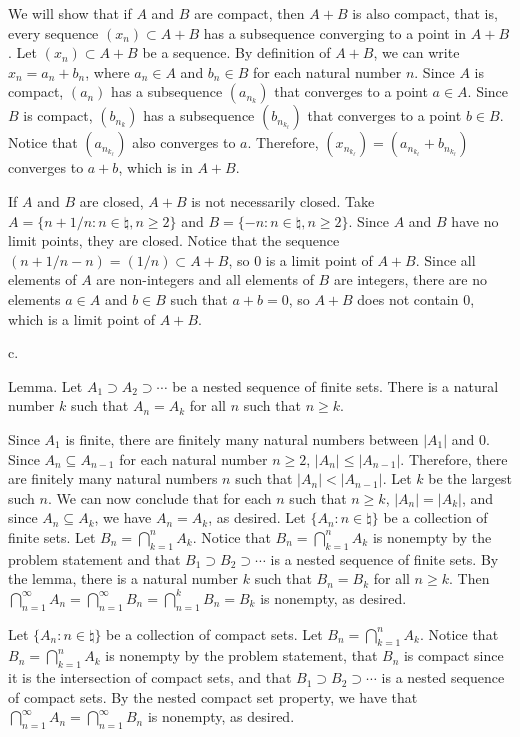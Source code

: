 We will show that if $A$ and $B$ are compact,
then $A + B$ is also compact, that is,
every sequence $(x_n) \subset A + B$ has a subsequence
converging to a point in $A + B$.
Let $(x_n) \subset A + B$ be a sequence.
By definition of $A + B$, we can write $x_n = a_n + b_n$,
where $a_n \in A$ and $b_n \in B$ for each natural number $n$.
Since $A$ is compact, $(a_n)$ has a subsequence $(a_{n_k})$
that converges to a point $a \in A$.
Since $B$ is compact, $(b_{n_k})$ has a subsequence $(b_{n_{k_\ell}})$
that converges to a point $b \in B$.
Notice that $(a_{n_{k_\ell}})$ also converges to $a$.
Therefore, $(x_{n_{k_\ell}}) = (a_{n_{k_\ell}} + b_{n_{k_\ell}})$
converges to $a + b$, which is in $A + B$.

If $A$ and $B$ are closed, $A + B$ is not necessarily closed.
Take $A = \{n + 1/n : n \in \natural, n \ge 2\}$ and
$B = \{-n : n \in \natural, n \ge 2\}$.
Since $A$ and $B$ have no limit points, they are closed.
Notice that the sequence $(n + 1/n - n) = (1/n) \subset A+B$,
so $0$ is a limit point of $A + B$.
Since all elements of $A$ are non-integers and
all elements of $B$ are integers,
there are no elements $a \in A$ and $b \in B$ such that $a + b = 0$,
so $A + B$ does not contain $0$, which is a limit point of $A + B$.
\medskip
\item{} c.

\proclaim Lemma. Let $A_1 \supset A_2 \supset \cdots$
be a nested sequence of finite sets.
There is a natural number $k$ such that
$A_n = A_k$ for all $n$ such that $n \ge k$.

Since $A_1$ is finite,
there are finitely many natural numbers between $|A_1|$ and $0$.
Since $A_n \subseteq A_{n-1}$ for each natural number $n \ge 2$,
$|A_n| \le |A_{n-1}|$.
Therefore, there are finitely many natural numbers $n$ such that
$|A_n| < |A_{n-1}|$.
Let $k$ be the largest such $n$.
We can now conclude that for each $n$ such that $n \ge k$,
$|A_n| = |A_k|$, and since $A_n \subseteq A_k$,
we have $A_n = A_k$, as desired.
\smallskip
Let $\{A_n : n \in \natural\}$ be a collection of finite sets.
Let $B_n = \bigcap _{k=1} ^n A_k$.
Notice that $B_n = \bigcap _{k=1} ^n A_k$ is nonempty by the problem statement
and that $B_1 \supset B_2 \supset \cdots$ is a nested sequence of finite sets.
By the lemma, there is a natural number $k$ such that
$B_n = B_k$ for all $n \ge k$.
Then $\bigcap _{n=1} ^\infty A_n = \bigcap _{n=1} ^\infty B_n =
\bigcap _{n=1} ^k B_n = B_k$ is nonempty, as desired.

Let $\{A_n : n \in \natural\}$ be a collection of compact sets.
Let $B_n = \bigcap _{k=1} ^n A_k$.
Notice that $B_n = \bigcap _{k=1} ^n A_k$ is nonempty by the problem statement,
that $B_n$ is compact since it is the intersection of compact sets,
and that $B_1 \supset B_2 \supset \cdots$ is a nested sequence of compact sets.
By the nested compact set property, we have that
$\bigcap _{n=1} ^\infty A_n = \bigcap _{n=1} ^\infty B_n$
is nonempty, as desired.

